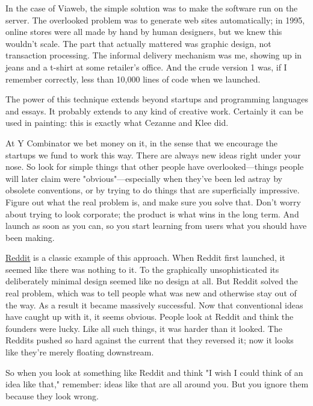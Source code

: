 In the case of Viaweb, the simple solution was to make the software
run on the server.  The overlooked problem was to generate web sites
automatically; in 1995, online stores were all made by hand by human
designers, but we knew this wouldn't scale.  The part that actually
mattered was graphic design, not transaction processing.
The informal delivery mechanism was me, showing up in jeans and a
t-shirt at some retailer's office.  And the crude version 1 was,
if I remember correctly, less than 10,000 lines of code when we
launched.

The power of this technique extends beyond startups and programming
languages and essays.  It probably extends to any kind of creative
work.  Certainly it can be used in painting: this is exactly 
what Cezanne and Klee did.

At Y Combinator we bet money on it, in the sense that we encourage
the startups we fund to work this way. There are always new ideas
right under your nose.  So look for simple things that other people
have overlooked---things people will later claim were 
"obvious"---especially when they've been led astray by obsolete 
conventions,
or by trying to do things that are superficially impressive.  Figure
out what the real problem is, and make sure you solve that.  Don't
worry about trying to look corporate; the product is what wins in
the long term.  And launch as soon as you can, so you start learning
from users what you should have been making.

\href{http://reddit.com}{Reddit} is a classic example of 
this approach.  When Reddit first
launched, it seemed like there was nothing to it.  To the graphically
unsophisticated its deliberately minimal design seemed like no
design at all.  But Reddit solved the real problem, which was to
tell people what was new and otherwise stay out of the way.  As a
result it became massively successful.  Now that conventional ideas
have caught up with it, it seems obvious.  People look at Reddit
and think the founders were lucky.  Like all such things, it was
harder than it looked.  The Reddits pushed so hard against the
current that they reversed it; now it looks like they're merely
floating downstream.

So when you look at something like Reddit and think "I wish I could
think of an idea like that," remember: ideas like that are all
around you.  But you ignore them because they look wrong.





